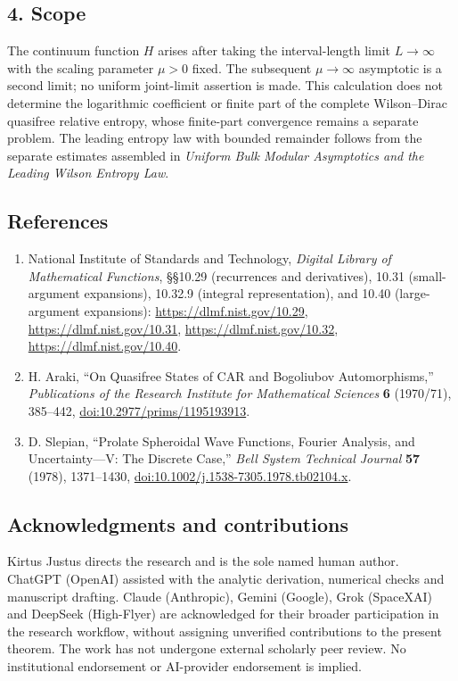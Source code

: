 \documentclass[
  10pt,
  a4paper,
]{article}
\providecommand{\tightlist}{%
  \setlength{\itemsep}{0pt}\setlength{\parskip}{0pt}}
\begin{document}
\subsection{4. Scope}\label{scope}

The continuum function \(H\) arises after taking the interval-length limit \(L\to\infty\) with the scaling parameter \(\mu>0\) fixed. The subsequent \(\mu\to\infty\) asymptotic is a second limit; no uniform joint-limit assertion is made. This calculation does not determine the logarithmic coefficient or finite part of the complete Wilson--Dirac quasifree relative entropy, whose finite-part convergence remains a separate problem. The leading entropy law with bounded remainder follows from the separate estimates assembled in \emph{Uniform Bulk Modular Asymptotics and the Leading Wilson Entropy Law}.

\subsection{References}\label{references}

\begin{enumerate}
\def\labelenumi{\arabic{enumi}.}
\tightlist
\item
  National Institute of Standards and Technology, \emph{Digital Library of Mathematical Functions}, §§10.29 (recurrences and derivatives), 10.31 (small-argument expansions), 10.32.9 (integral representation), and 10.40 (large-argument expansions): \url{https://dlmf.nist.gov/10.29}, \url{https://dlmf.nist.gov/10.31}, \url{https://dlmf.nist.gov/10.32}, \url{https://dlmf.nist.gov/10.40}.
\item
  H. Araki, ``On Quasifree States of CAR and Bogoliubov Automorphisms,'' \emph{Publications of the Research Institute for Mathematical Sciences} \textbf{6} (1970/71), 385--442, \url{doi:10.2977/prims/1195193913}.
\item
  D. Slepian, ``Prolate Spheroidal Wave Functions, Fourier Analysis, and Uncertainty---V: The Discrete Case,'' \emph{Bell System Technical Journal} \textbf{57} (1978), 1371--1430, \url{doi:10.1002/j.1538-7305.1978.tb02104.x}.
\end{enumerate}

\subsection{Acknowledgments and contributions}\label{acknowledgments-and-contributions}

Kirtus Justus directs the research and is the sole named human author. ChatGPT (OpenAI) assisted with the analytic derivation, numerical checks and manuscript drafting. Claude (Anthropic), Gemini (Google), Grok (SpaceXAI) and DeepSeek (High-Flyer) are acknowledged for their broader participation in the research workflow, without assigning unverified contributions to the present theorem. The work has not undergone external scholarly peer review. No institutional endorsement or AI-provider endorsement is implied.
\end{document}
